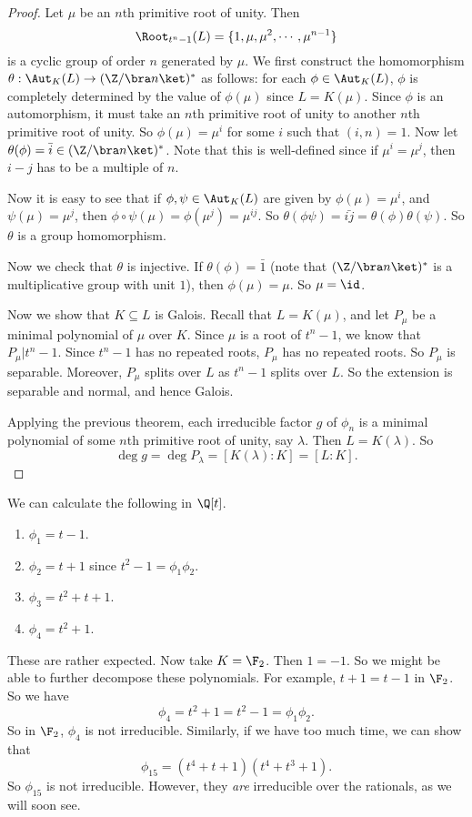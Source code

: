 \documentclass[a4paper]{article}
\begin{document}
\begin{proof}
  Let $\mu$ be an $n$th primitive root of unity. Then
  \[
    \Root_{t^n - 1}(L) = \{1, \mu, \mu^2, \cdots, \mu^{n - 1}\}
  \]
  is a cyclic group of order $n$ generated by $\mu$. We first construct the homomorphism $\theta: \Aut_K(L) \to (\Z/\bra n\ket)^*$ as follows: for each $\phi \in \Aut_K(L)$, $\phi$ is completely determined by the value of $\phi(\mu)$ since $L = K(\mu)$. Since $\phi$ is an automorphism, it must take an $n$th primitive root of unity to another $n$th primitive root of unity. So $\phi(\mu) = \mu^i$ for some $i$ such that $(i, n) = 1$. Now let $\theta(\phi) = \bar{i} \in (\Z/\bra n\ket)^*$. Note that this is well-defined since if $\mu^i = \mu^j$, then $i - j$ has to be a multiple of $n$.

  Now it is easy to see that if $\phi, \psi \in \Aut_K(L)$ are given by $\phi(\mu) = \mu^i$, and $\psi(\mu) = \mu^j$, then $\phi\circ \psi(\mu) = \phi(\mu^j) = \mu^{ij}$. So $\theta(\phi \psi) = \bar{ij} = \theta(\phi)\theta(\psi)$. So $\theta$ is a group homomorphism.

  Now we check that $\theta$ is injective. If $\theta(\phi) = \bar{1}$ (note that $(\Z/\bra n\ket)^*$ is a multiplicative group with unit $1$), then $\phi(\mu) = \mu$. So $\mu = \id$.

  Now we show that $K\subseteq L$ is Galois. Recall that $L = K(\mu)$, and let $P_\mu$ be a minimal polynomial of $\mu$ over $K$. Since $\mu$ is a root of $t^n - 1$, we know that $P_\mu | t^n - 1$.  Since $t^n - 1$ has no repeated roots, $P_\mu$ has no repeated roots. So $P_\mu$ is separable. Moreover, $P_\mu$ splits over $L$ as $t^n - 1$ splits over $L$. So the extension is separable and normal, and hence Galois.

  Applying the previous theorem, each irreducible factor $g$ of $\phi_n$ is a minimal polynomial of some $n$th primitive root of unity, say $\lambda$. Then $L = K(\lambda)$. So
  \[
    \deg g = \deg P_\lambda = [K(\lambda): K] = [L:K].
  \]
\end{proof}

\begin{eg}
  We can calculate the following in $\Q[t]$.
  \begin{enumerate}
    \item $\phi_1 = t - 1$.
    \item $\phi_2 = t + 1$ since $t^2 - 1 = \phi_1 \phi_2$.
    \item $\phi_3 = t^2 + t + 1$.
    \item $\phi_4 = t^2 + 1$.
  \end{enumerate}
  These are rather expected. Now take $K = \F_2$. Then $1 = -1$. So we might be able to further decompose these polynomials. For example, $t + 1 = t - 1$ in $\F_2$. So we have
  \[
    \phi_4 = t^2 + 1 = t^2 - 1 = \phi_1 \phi_2.
  \]
  So in $\F_2$, $\phi_4$ is not irreducible. Similarly, if we have too much time, we can show that
  \[
    \phi_{15} = (t^4 + t + 1)(t^4 + t^3 + 1).
  \]
  So $\phi_{15}$ is not irreducible. However, they \emph{are} irreducible over the rationals, as we will soon see.
\end{eg}
\end{document}
